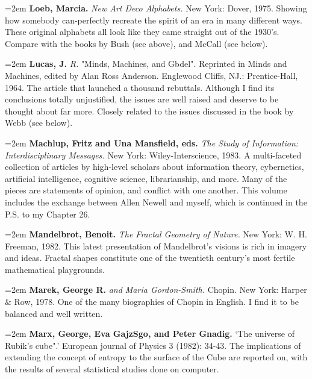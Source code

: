 \par\noindent\hangindent=2em {\bf Loeb, Marcia.} {\it New Art Deco Alphabets.} New York: Dover, 1975. Showing how somebody can-perfectly recreate the spirit of an era in many different ways. These original alphabets all look like they came straight out of the 1930's. Compare with the books by Bush (see above), and McCall (see below).

\par\noindent\hangindent=2em {\bf Lucas, J.} {\it R.} "Minds, Machines, and Gbdel". Reprinted in Minds and Machines, edited by Alan Ross Anderson. Englewood Cliffs, NJ.: Prentice-Hall, 1964. The article that launched a thousand rebuttals. Although I find its conclusions totally unjustified, the issues are well raised and deserve to be thought about far more. Closely related to the issues discussed in the book by Webb (see below).

\par\noindent\hangindent=2em {\bf Machlup, Fritz and Una Mansfield, eds.} {\it The Study of Information: Interdisciplinary Messages.} New York: Wiley-Interscience, 1983. A multi-faceted collection of articles by high-level scholars about information theory, cybernetics, artificial intelligence, cognitive science, librarianship, and more. Many of the pieces are statements of opinion, and conflict with one another. This volume includes the exchange between Allen Newell and myself, which is continued in the P.S. to my Chapter 26.

\par\noindent\hangindent=2em {\bf Mandelbrot, Benoit.} {\it The Fractal Geometry of Nature.} New York: W. H. Freeman, 1982. This latest presentation of Mandelbrot's visions is rich in imagery and ideas. Fractal shapes constitute one of the twentieth century's most fertile mathematical playgrounds.

\par\noindent\hangindent=2em {\bf Marek, George R.} {\it and Maria Gordon-Smith.} Chopin. New York: Harper \& Row, 1978. One of the many biographies of Chopin in English. I find it to be balanced and well written.

\par\noindent\hangindent=2em {\bf Marx, George, Eva GajzSgo, and Peter Gnadig.} `The universe of Rubik's cube".' European journal of Physics 3 (1982): 34-43. The implications of extending the concept of entropy to the surface of the Cube are reported on, with the results of several statistical studies done on computer.

